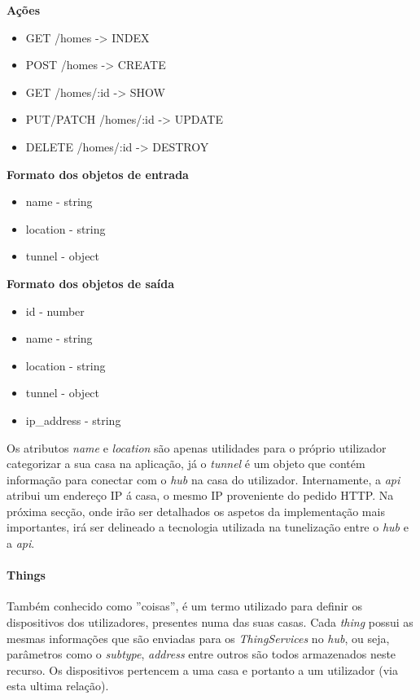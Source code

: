 \textbf{Ações}
\begin{itemize}
    \item GET /homes -> INDEX
    \item POST /homes -> CREATE
    \item GET /homes/:id -> SHOW
    \item PUT/PATCH /homes/:id -> UPDATE
    \item DELETE /homes/:id -> DESTROY
\end{itemize}

\textbf{Formato dos objetos de entrada}
\begin{itemize}
    \item name - string
    \item location - string
    \item tunnel - object
\end{itemize}

\textbf{Formato dos objetos de saída}
\begin{itemize}
    \item id - number
    \item name - string
    \item location - string
    \item tunnel - object
    \item ip{\_}address - string
\end{itemize}

Os atributos \textit{name} e \textit{location} são apenas utilidades para o próprio utilizador categorizar a sua casa na aplicação, já o \textit{tunnel} é um objeto que contém informação para conectar com o \textit{hub} na casa do utilizador. Internamente, a \textit{api} atribui um endereço IP á casa, o mesmo IP proveniente do pedido HTTP. Na próxima secção, onde irão ser detalhados os aspetos da implementação mais importantes, irá ser delineado a tecnologia utilizada na tunelização entre o \textit{hub} e a \textit{api}.

\paragraph*{Things}

Também conhecido como ''coisas'', é um termo utilizado para definir os dispositivos dos utilizadores, presentes numa das suas casas. Cada \textit{thing} possui as mesmas informações que são enviadas para os \textit{ThingServices} no \textit{hub}, ou seja, parâmetros como o \textit{subtype}, \textit{address} entre outros são todos armazenados neste recurso. Os dispositivos pertencem a uma casa e portanto a um utilizador (via esta ultima relação).

